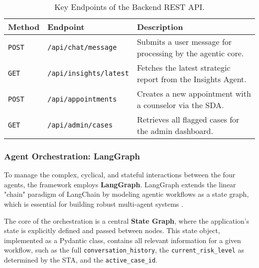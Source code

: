 \begin{table}[h]
    \centering
    \caption{Key Endpoints of the Backend REST API.}
    \label{tab:api_endpoints}
    \begin{tabular}{lll}
        \toprule
        \textbf{Method} & \textbf{Endpoint} & \textbf{Description} \\
        \midrule
        \texttt{POST} & \texttt{/api/chat/message} & Submits a user message for processing by the agentic core. \\
        \texttt{GET} & \texttt{/api/insights/latest} & Fetches the latest strategic report from the Insights Agent. \\
        \texttt{POST} & \texttt{/api/appointments} & Creates a new appointment with a counselor via the SDA. \\
        \texttt{GET} & \texttt{/api/admin/cases} & Retrieves all flagged cases for the admin dashboard. \\
        \bottomrule
    \end{tabular}
\end{table}

\subsubsection{Agent Orchestration: LangGraph}

To manage the complex, cyclical, and stateful interactions between the four agents, the framework employs \textbf{LangGraph}. LangGraph extends the linear "chain" paradigm of LangChain by modeling agentic workflows as a state graph, which is essential for building robust multi-agent systems \cite{mathew2025largelanguagemodelagents, barua2024llmagentsreview}.

The core of the orchestration is a central \textbf{State Graph}, where the application's state is explicitly defined and passed between nodes. This state object, implemented as a Pydantic class, contains all relevant information for a given workflow, such as the full \texttt{conversation\_history}, the \texttt{current\_risk\_level} as determined by the STA, and the \texttt{active\_case\_id}. 

